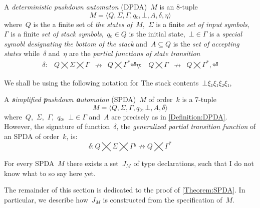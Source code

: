 \begin{Definition}
  \label{Definition:DPDA}
  A \emph{deterministic pushdown automaton} (DPDA)~$M$ is an 8-tuple
  \[
    M =⟨Q,Σ,Γ, q₀,⊥, A,δ,η⟩
  \]
  where~$Q$ is the a finite set of
  \emph{the states of~$M$},~$Σ$ is a finite
  \emph{set of input symbols},~$Γ$ is a finite
  \emph{set of stack symbols},~$q₀∈Q$ is the initial state,~$⊥∈Γ$
  is a \emph{special symobl designating the bottom of the stack}
  and~$A⊆Q$ is the \emph{set of accepting states} while~$δ$ and~$η$ are
  the \emph{partial functions of state transition}
  \[
    \begin{array}{crlc}
      δ: & Q⨉Σ⨉Γ &↛& Q⨉Γ^*⏎
      η: & Q⨉Γ &↛& Q⨉Γ^*,⏎
    \end{array}
  \]
\end{Definition}
We shall be using the following notation for
The stack contents~$⊥ξ₁ξ₁ξ₂ξ₁$,

\begin{Definition}
  \label{Definition:SPDA}
  A \emph{\textbf simplified \textbf pushdown \textbf automaton} (SPDA)~$M$ of order~$k$ is a 7-tuple
  \[
    M =⟨Q,Σ,Γ,q₀,⊥, A,δ⟩
  \]
  where~$Q$,~$Σ$,~$Γ$,~$q₀$,~$⊥∈Γ$ and~$A$ are precisely as in \cref{Definition:DPDA}.
  However, the signature of function~$δ$, the \emph{generalized partial transition function}
  of an SPDA of order~$k$, is:
  \begin{equation}
    \label{Equation:generalized:transition}
      δ: Q⨉Σ⨉Γᵏ↛Q⨉Γ^*
    \end{equation}
\end{Definition}

\begin{Theorem}
  \label{Theorem:SPDA}
  For every SPDA~$M$ there exists a set~$J_M$ of \Java type declarations, such that
    I do not know what to so say here yet.
\end{Theorem}

The remainder of this section is dedicated to the proof of \cref{Theorem:SPDA}.
In particular, we describe how~$J_M$ is constructed from the
  specification of~$M$.

